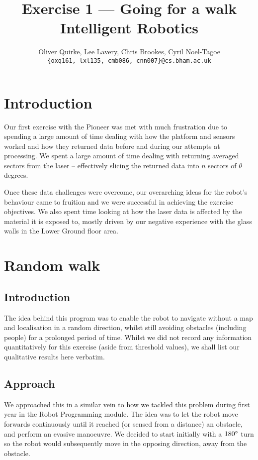 \documentclass[twocolumn,11pt]{article}
\title{Exercise 1 --- Going for a walk\\ {\Large Intelligent Robotics}}
\author{Oliver Quirke, Lee Lavery, Chris Brookes, Cyril Noel-Tagoe\\ \nolinkurl{{oxq161, lxl135, cmb086, cnn007}@cs.bham.ac.uk}}
\begin{document}
\date{}

\maketitle

\section{Introduction}
Our first exercise with the Pioneer was met with much frustration due to spending a large amount of time dealing with how the platform and sensors worked and how they returned data before and during our attempts at processing. We spent a large amount of time dealing with returning averaged sectors from the laser -- effectively slicing the returned data into $n$ sectors of $\theta$ degrees. 

Once these data challenges were overcome, our overarching ideas for the robot's behaviour came to fruition and we were successful in achieving the exercise objectives. We also spent time looking at how the laser data is affected by the material it is exposed to, mostly driven by our negative experience with the glass walls in the Lower Ground floor area.

\section{Random walk}
\subsection{Introduction}

The idea behind this program was to enable the robot to navigate without a map and localisation in a random direction, whilst still avoiding obstacles (including people) for a prolonged period of time. Whilst we did not record any information quantitatively for this exercise (aside from threshold values), we shall list our qualitative results here verbatim.

\subsection{Approach}

We approached this in a similar vein to how we tackled this problem during first year in the \textsf{Robot Programming} module. The idea was to let the robot move forwards continuously until it reached (or sensed from a distance) an obstacle, and perform an evasive manoeuvre. We decided to start initially with a $180\degree$ turn so the robot would subsequently move in the opposing direction, away from the obstacle. 
\end{document}
